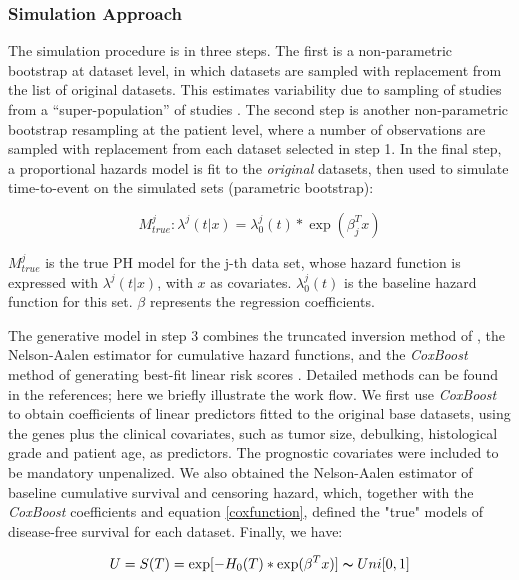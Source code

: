 \documentclass{bioinfo}
\begin{document}
    \subsubsection{Simulation Approach}
    The simulation procedure is in three steps. The first is a non-parametric
    bootstrap at dataset level, in which datasets are sampled with
    replacement from the list of original datasets. This
    estimates variability due to sampling of studies from a
    ``super-population'' of studies \citep{Hartley1975-bj}.  The
    second step is another
    non-parametric bootstrap resampling at the patient
    level, where a number of observations are sampled with replacement from
    each dataset selected in step 1.
    In the final step, a proportional hazards model is fit to the \emph{original} datasets, then used to
    simulate time-to-event on the simulated sets (parametric
    bootstrap):

    \begin{equation}\label{coxfunction}
      M^{j}_{true} : \lambda^{j}(t|x) = \lambda^{j}_{0}(t) * \exp(\beta_{j}^{T}x)
    \end{equation}

    $M^{j}_{true}$ is the true PH model for the j-th data set,
    whose hazard function is expressed with $\lambda^{j}(t|x)$,
    with $x$ as covariates. $\lambda^{j}_{0}(t)$ is the baseline
    hazard function for this set. $\beta$ represents the regression
    coefficients.

    The generative model in step 3 combines the truncated inversion
    method of \citet{Bender2005}, the Nelson-Aalen estimator
    \citep{Nelson1969,Nelson1972,Aalen1978}
    for cumulative hazard functions, and the \emph{CoxBoost} method of
    generating best-fit linear risk scores
    \citep{Binder2008}. Detailed methods can be found in the references;
    here we briefly illustrate the work flow. We first
    use \emph{CoxBoost} to obtain coefficients of linear predictors
    fitted to the original base datasets, using the genes plus the 
    clinical covariates, such as
    tumor size, debulking, histological grade and patient age, as predictors.
    The prognostic covariates were included to be mandatory unpenalized.
    We also obtained the Nelson-Aalen estimator of baseline cumulative survival and
    censoring hazard, which, together with the \emph{CoxBoost}
    coefficients and equation \ref{coxfunction}, defined the "true"
    models of disease-free survival for each dataset.  Finally, we have:

    \begin{equation}\label{uniformrv}
      U = S(T) = \exp[-H_{0}(T) * \exp(\beta^{T}x)] \thicksim Uni[0,1]
    \end{equation}
\end{document}
